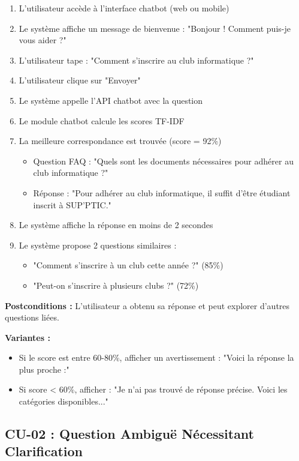\documentclass[11pt,a4paper]{article}
\begin{document}
\begin{enumerate}
    \item L'utilisateur accède à l'interface chatbot (web ou mobile)
    \item Le système affiche un message de bienvenue : "Bonjour ! Comment puis-je vous aider ?"
    \item L'utilisateur tape : "Comment s'inscrire au club informatique ?"
    \item L'utilisateur clique sur "Envoyer"
    \item Le système appelle l'API chatbot avec la question
    \item Le module chatbot calcule les scores TF-IDF
    \item La meilleure correspondance est trouvée (score = 92\%)
    \begin{itemize}
        \item Question FAQ : "Quels sont les documents nécessaires pour adhérer au club informatique ?"
        \item Réponse : "Pour adhérer au club informatique, il suffit d'être étudiant inscrit à SUP'PTIC."
    \end{itemize}
    \item Le système affiche la réponse en moins de 2 secondes
    \item Le système propose 2 questions similaires :
    \begin{itemize}
        \item "Comment s'inscrire à un club cette année ?" (85\%)
        \item "Peut-on s'inscrire à plusieurs clubs ?" (72\%)
    \end{itemize}
\end{enumerate}

\textbf{Postconditions :} L'utilisateur a obtenu sa réponse et peut explorer d'autres questions liées.

\textbf{Variantes :}
\begin{itemize}
    \item Si le score est entre 60-80\%, afficher un avertissement : "Voici la réponse la plus proche :"
    \item Si score < 60\%, afficher : "Je n'ai pas trouvé de réponse précise. Voici les catégories disponibles..."
\end{itemize}

\subsection{CU-02 : Question Ambiguë Nécessitant Clarification}
\end{document}

